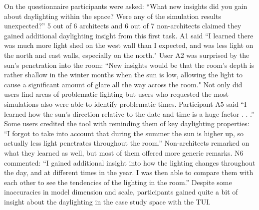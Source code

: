 \documentclass{article}
\begin{document}
On the questionnaire participants were asked: ``What new insights did
you gain about daylighting within the space?  Were any of the
simulation results unexpected?''
%
5 out of 6 architects and 6 out of 7 non-architects claimed they
gained additional daylighting insight from this first task.  A1 said
``I learned there was much more light shed on the west wall than I
expected, and was less light on the north and east walls, especially
on the north."  User A2 was surprised by the sun's penetration into
the room: ``New insights would be that the room's depth is rather
shallow in the winter months when the sun is low, allowing the light
to cause a significant amount of glare all the way across the room."
Not only did users find areas of problematic lighting but users who
requested the most simulations also were able to identify problematic
times.  Participant A5 said ``I learned how the sun's direction
relative to the date and time is a huge factor . . .''
Some users credited the tool with reminding them
of key
daylighting properties:
``I forgot to take into account that during the
summer the sun is higher up, so actually less light penetrates
throughout the room.''  Non-architects remarked on what they learned
as well, but most of them offered more generic remarks.  N6 commented:
``I gained additional insight into how the lighting changes throughout
the day, and at different times in the year.  I was then able to
compare them with each other to see the tendencies of the lighting in
the room.''
%
Despite some inaccuracies in model dimension and scale, participants
gained quite a bit of insight about the daylighting in the case study
space with the TUI. 




\end{document}
